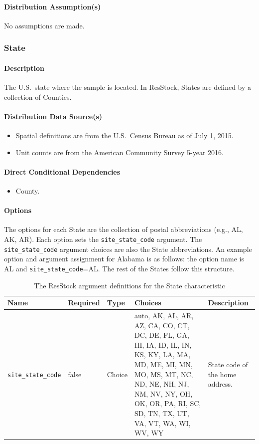 \paragraph{Distribution Assumption(s)}
No assumptions are made.

\subsubsection{State}
\paragraph{Description}
The U.S.~state where the sample is located. In ResStock, States are defined by a collection of Counties.

\paragraph{Distribution Data Source(s)}
\begin{itemize} 
\item
  Spatial definitions are from the U.S.~Census Bureau as of July 1,
  2015.
\item
  Unit counts are from the American Community Survey 5-year 2016.
\end{itemize}

\paragraph{Direct Conditional Dependencies}
\begin{itemize} 
\item County.
\end{itemize}

\paragraph{Options}
The options for each State are the collection of postal abbreviations (e.g., AL, AK, AR). Each option sets the \texttt{site\_state\_code} argument. The \texttt{site\_state\_code} argument choices are also the State abbreviations. An example option and argument assignment for Alabama is as follows: the option name is AL and \texttt{site\_state\_code}=AL. The rest of the States follow this structure.

\begin{longtable}[]{ |p{3.5cm}|p{1.5cm}|p{1cm}|p{4.5cm}|p{3cm}| }
\caption{The ResStock argument definitions for the State characteristic} \label{table:hc_arg_def_state}  \\
\toprule\noalign{}
Name & Required & Type & Choices & Description \\
\midrule\noalign{}
\endhead
\bottomrule\noalign{}
\endlastfoot
\texttt{site\_state\_code} & false  & Choice & auto, AK, AL, AR, AZ,
CA, CO, CT, DC, DE, FL, GA, HI, IA, ID, IL, IN, KS, KY, LA, MA, MD, ME,
MI, MN, MO, MS, MT, NC, ND, NE, NH, NJ, NM, NV, NY, OH, OK, OR, PA, RI,
SC, SD, TN, TX, UT, VA, VT, WA, WI, WV, WY & State code of the home
address. \\
\end{longtable}

